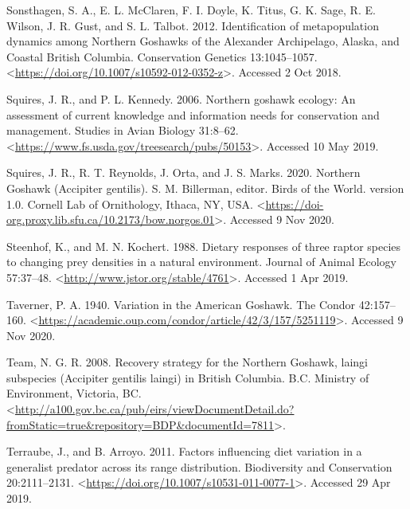 \documentclass{sfuthesis}
\begin{document}
\leavevmode\hypertarget{ref-sonsthagen_identification_2012}{}%
Sonsthagen, S. A., E. L. McClaren, F. I. Doyle, K. Titus, G. K. Sage, R. E. Wilson, J. R. Gust, and S. L. Talbot. 2012. Identification of metapopulation dynamics among Northern Goshawks of the Alexander Archipelago, Alaska, and Coastal British Columbia. Conservation Genetics 13:1045--1057. \textless{}\url{https://doi.org/10.1007/s10592-012-0352-z}\textgreater. Accessed 2 Oct 2018.

\leavevmode\hypertarget{ref-squires_northern_2006}{}%
Squires, J. R., and P. L. Kennedy. 2006. Northern goshawk ecology: An assessment of current knowledge and information needs for conservation and management. Studies in Avian Biology 31:8--62. \textless{}\url{https://www.fs.usda.gov/treesearch/pubs/50153}\textgreater. Accessed 10 May 2019.

\leavevmode\hypertarget{ref-squires_northern_2020}{}%
Squires, J. R., R. T. Reynolds, J. Orta, and J. S. Marks. 2020. Northern Goshawk (Accipiter gentilis). S. M. Billerman, editor. Birds of the World. version 1.0. Cornell Lab of Ornithology, Ithaca, NY, USA. \textless{}\url{https://doi-org.proxy.lib.sfu.ca/10.2173/bow.norgos.01}\textgreater. Accessed 9 Nov 2020.

\leavevmode\hypertarget{ref-steenhof_dietary_1988}{}%
Steenhof, K., and M. N. Kochert. 1988. Dietary responses of three raptor species to changing prey densities in a natural environment. Journal of Animal Ecology 57:37--48. \textless{}\url{http://www.jstor.org/stable/4761}\textgreater. Accessed 1 Apr 2019.

\leavevmode\hypertarget{ref-taverner_variation_1940}{}%
Taverner, P. A. 1940. Variation in the American Goshawk. The Condor 42:157--160. \textless{}\url{https://academic.oup.com/condor/article/42/3/157/5251119}\textgreater. Accessed 9 Nov 2020.

\leavevmode\hypertarget{ref-northern_goshawk_recovery_team_recovery_2008}{}%
Team, N. G. R. 2008. Recovery strategy for the Northern Goshawk, laingi subspecies (Accipiter gentilis laingi) in British Columbia. B.C. Ministry of Environment, Victoria, BC. \textless{}\url{http://a100.gov.bc.ca/pub/eirs/viewDocumentDetail.do?fromStatic=true\&repository=BDP\&documentId=7811}\textgreater.

\leavevmode\hypertarget{ref-terraube_factors_2011}{}%
Terraube, J., and B. Arroyo. 2011. Factors influencing diet variation in a generalist predator across its range distribution. Biodiversity and Conservation 20:2111--2131. \textless{}\url{https://doi.org/10.1007/s10531-011-0077-1}\textgreater. Accessed 29 Apr 2019.
\end{document}

